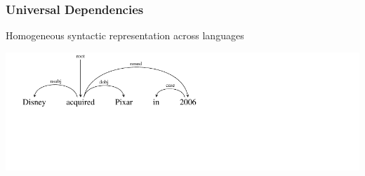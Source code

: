 \documentclass[mathserif,12pt]{beamer}
\begin{document}
\begin{frame}
\frametitle{Universal Dependencies}
Homogeneous syntactic representation across languages

\begin{center}
\includegraphics[trim=0em 5em 15em 0em,clip=true,scale=1.0
]{figures/dependency-word-order-english}

\end{center}

\end{frame} 
\end{document}
